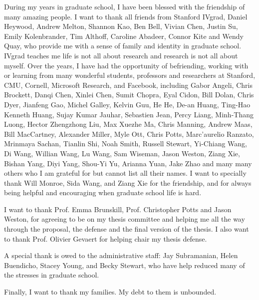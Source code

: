 During my years in graduate school, I have been blessed with the friendship of many amazing people. 
I want to thank all friends from Stanford IVgrad,  Daniel Heywood, Andrew Melton, 
Shannon Kao,
Ben Bell, Vivian Chen, Justin Su, Emily Kolenbrander, Tim Althoff, 
Caroline Abadeer,
Connor Kite
and Wendy Quay,
who provide me with a sense of family and identity in graduate school. 
IVgrad teaches me life is not all about research and research is not all about myself. 
Over the years, 
I have had the opportunity  of befriending, working with or learning from many wonderful students, professors
and researchers  at Stanford, CMU, Cornell, Microsoft Research, and Facebook, including 
Gabor Angeli, 
Chris Brockett, 
Danqi Chen, Xinlei Chen, Sumit Chopra, 
Eyal Cidon, 
 Bill Dolan, 
 Chris Dyer, 
 Jianfeng Gao, Michel Galley, 
Kelvin Guu,
He He, De-an Huang, Ting-Hao Kenneth Huang,
Sujay Kumar Jauhar,
Sebastien Jean, 
Percy Liang, 
Minh-Thang Luong, Hector Zhengzhong Liu, Max Xuezhe Ma, Chris Manning, 
Andrew Maas, 
Bill MacCartney,
Alexander Miller, 
Myle Ott, 
Chris Potts, 
Marc'aurelio Ranzato,
Mrinmaya Sachan,
Tianlin Shi, 
Noah Smith,
Russell Stewart, 
Yi-Chiang Wang, 
Di Wang, 
Willian Wang, 
Lu Wang, 
Sam Wiseman, 
Jason Weston, 
Ziang Xie,
Bishan Yang,
Diyi Yang, 
Shou-Yi Yu,
Arianna Yuan,
Jake Zhao and many many others who I am grateful for but cannot list all their names. 
I want to specially thank Will Monroe, Sida Wang, 
and Ziang Xie for the friendship, and
 for always being helpful and encouraging when
 graduate school 
  life is hard. 

I want to thank Prof. Emma Brunskill,
Prof. Christopher Potts  and Jason Weston, for agreeing to be on my thesis committee and  helping me all the way through the proposal, the defense and the 
final version of the thesis. I also want to thank Prof. Olivier Gevaert for helping chair my thesis defense. 

A special thank is owed to the administrative staff: Jay Subramanian, Helen Buendicho, Stacey Young, 
and Becky Stewart, who have help reduced many of the stresses in graduate school. 

Finally, I want to thank my families. My debt to them is unbounded.

